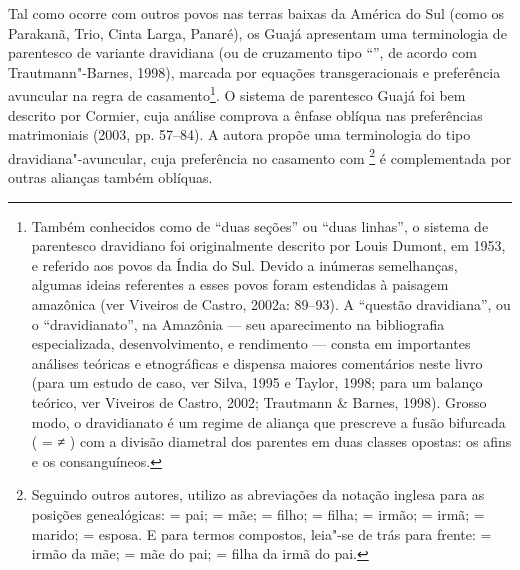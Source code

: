 Tal como ocorre com outros povos nas terras baixas da América do Sul
(como os Parakanã, Trio, Cinta Larga, Panaré), os Guajá apresentam uma
terminologia de parentesco de variante dravidiana (ou de cruzamento tipo
``'', de acordo com Trautmann"-Barnes, 1998), marcada por equações
transgeracionais e preferência avuncular na regra de casamento\footnote{Também
  conhecidos como de ``duas seções'' ou ``duas linhas'', o sistema de
  parentesco dravidiano foi originalmente descrito por Louis Dumont, em
  1953, e referido aos povos da Índia do Sul. Devido a inúmeras
  semelhanças, algumas ideias referentes a esses povos foram estendidas
  à paisagem amazônica (ver Viveiros de Castro, 2002a: 89--93). A
  ``questão dravidiana'', ou o ``dravidianato'', na Amazônia --- seu
  aparecimento na bibliografia especializada, desenvolvimento, e
  rendimento --- consta em importantes análises teóricas e etnográficas e
  dispensa maiores comentários neste livro (para um estudo de caso, ver
  Silva, 1995 e Taylor, 1998; para um balanço teórico, ver Viveiros de
  Castro, 2002; Trautmann \& Barnes, 1998). Grosso modo, o dravidianato
  é um regime de aliança que prescreve a fusão bifurcada ( =  ≠ )
  com a divisão diametral dos parentes em duas classes opostas: os afins
  e os consanguíneos.}. O sistema de parentesco Guajá foi bem descrito
por Cormier, cuja análise comprova a ênfase oblíqua nas preferências
matrimoniais (2003, pp. 57--84). A autora propõe uma terminologia do tipo
dravidiana"-avuncular, cuja preferência no casamento com \footnote{Seguindo
  outros autores, utilizo as abreviações da notação inglesa para as
  posições genealógicas:  = pai;  = mãe;  = filho;  = filha;  =
  irmão;  = irmã;  = marido;  = esposa. E para termos compostos,
  leia"-se de trás para frente:  = irmão da mãe;  = mãe do pai;  =
  filha da irmã do pai.} é complementada por outras alianças também
oblíquas.

